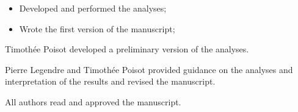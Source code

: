 \setcounter{corA}{0} %
\setcounter{secnumdepth}{1}
\anglais


\contributions%
{
    \begin{itemize}
        \item Developed and performed the analyses;
        \item Wrote the first version of the manuscript;
    \end{itemize}

    Timothée Poisot developed a preliminary version of the analyses. 
    
    Pierre Legendre and Timothée Poisot provided guidance on the analyses and 
    interpretation of the results and revised the manuscript.
    
    All authors read and approved the manuscript.\\[1cm]
}

